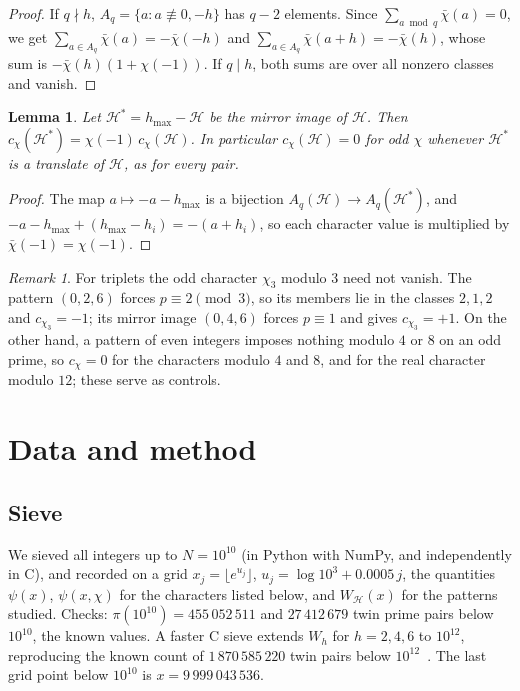 \documentclass[11pt]{amsart}
\newtheorem{lemma}{Lemma}
\theoremstyle{remark}
\newtheorem{remark}{Remark}
\newcommand{\cH}{\mathcal{H}}
\begin{document}
\begin{proof}
If $q\nmid h$, $A_q=\{a: a\not\equiv 0,-h\}$ has $q-2$ elements. Since $\sum_{a\bmod q}\bar\chi(a)=0$, we get $\sum_{a\in A_q}\bar\chi(a)=-\bar\chi(-h)$ and $\sum_{a\in A_q}\bar\chi(a+h)=-\bar\chi(h)$, whose sum is $-\bar\chi(h)(1+\chi(-1))$. If $q\mid h$, both sums are over all nonzero classes and vanish.
\end{proof}

\begin{lemma}\label{lem:mirror}
Let $\cH^*=h_{\max}-\cH$ be the mirror image of $\cH$. Then $c_\chi(\cH^*)=\chi(-1)\,c_\chi(\cH)$. In particular $c_\chi(\cH)=0$ for odd $\chi$ whenever $\cH^*$ is a translate of $\cH$, as for every pair.
\end{lemma}

\begin{proof}
The map $a\mapsto -a-h_{\max}$ is a bijection $A_q(\cH)\to A_q(\cH^*)$, and $-a-h_{\max}+(h_{\max}-h_i)=-(a+h_i)$, so each character value is multiplied by $\bar\chi(-1)=\chi(-1)$.
\end{proof}

\begin{remark}
For triplets the odd character $\chi_3$ modulo $3$ need not vanish. The pattern $(0,2,6)$ forces $p\equiv 2\pmod 3$, so its members lie in the classes $2,1,2$ and $c_{\chi_3}=-1$; its mirror image $(0,4,6)$ forces $p\equiv1$ and gives $c_{\chi_3}=+1$. On the other hand, a pattern of even integers imposes nothing modulo $4$ or $8$ on an odd prime, so $c_\chi=0$ for the characters modulo $4$ and $8$, and for the real character modulo $12$; these serve as controls.
\end{remark}

\section{Data and method}\label{sec:method}

\subsection*{Sieve}
We sieved all integers up to $N=10^{10}$ (in Python with NumPy, and independently in C), and recorded on a grid $x_j=\lfloor e^{u_j}\rfloor$, $u_j=\log 10^3+0.0005\,j$, the quantities $\psi(x)$, $\psi(x,\chi)$ for the characters listed below, and $W_\cH(x)$ for the patterns studied. Checks: $\pi(10^{10})=455\,052\,511$ and $27\,412\,679$ twin prime pairs below $10^{10}$, the known values. A faster C sieve extends $W_h$ for $h=2,4,6$ to $10^{12}$, reproducing the known count of $1\,870\,585\,220$ twin pairs below $10^{12}$~\cite{OEIS}. The last grid point below $10^{10}$ is $x=9\,999\,043\,536$.
\end{document}
